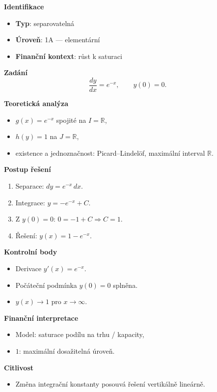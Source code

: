 \begin{example}
\label{ex:1a2}

\textbf{Identifikace}
\begin{itemize}
\item \textbf{Typ}: separovatelná
\item \textbf{Úroveň}: 1A — elementární
\item \textbf{Finanční kontext}: růst k saturaci
\end{itemize}

\textbf{Zadání}
\[
\frac{dy}{dx} = e^{-x}, \qquad y(0)=0.
\]

\textbf{Teoretická analýza}
\begin{itemize}
\item $g(x)=e^{-x}$ spojité na $I=\mathbb{R}$,
\item $h(y)=1$ na $J=\mathbb{R}$,
\item existence a jednoznačnost: Picard–Lindelöf, maximální interval $\mathbb{R}$.
\end{itemize}

\textbf{Postup řešení}
\begin{enumerate}
\item Separace: $dy = e^{-x}\,dx$.
\item Integrace: $y = -e^{-x} + C$.
\item Z $y(0)=0$: $0 = -1 + C \Rightarrow C=1$.
\item Řešení: $y(x) = 1 - e^{-x}$.
\end{enumerate}

\textbf{Kontrolní body}
\begin{itemize}
\item Derivace $y'(x)=e^{-x}$.
\item Počáteční podmínka $y(0)=0$ splněna.
\item $y(x)\to 1$ pro $x\to\infty$.
\end{itemize}

\textbf{Finanční interpretace}
\begin{itemize}
\item Model: saturace podílu na trhu / kapacity,
\item $1$: maximální dosažitelná úroveň.
\end{itemize}

\textbf{Citlivost}
\begin{itemize}
\item Změna integrační konstanty posouvá řešení vertikálně lineárně.
\end{itemize}
\end{example}

